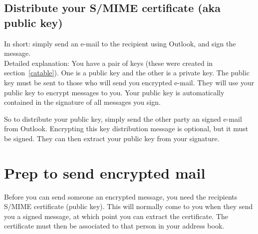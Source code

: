 \documentclass[pdftex,12pt,titlepage=false]{scrartcl}
\begin{document}

\subsection{Distribute your S/MIME certificate (aka public key)}\label{distribution}
In short: simply send an e-mail to the recipient using Outlook, and sign the message.\\

Detailed explanation: You have a pair of keys (these were created in
section~\ref{catable}).  One is a public key and the other is a
private key.  The public key must be sent to those who will send you
encrypted e-mail.  They will use your public key to encrypt messages
to you.  Your public key is automatically contained in the signature
of all messages you sign.

So to distribute your public key, simply send the other party an
signed e-mail from Outlook.  Encrypting this key distribution message
is optional, but it must be signed.  They can then extract your public
key from your signature.

\section{Prep to send encrypted mail%
}
Before you can send someone an encrypted message, you need the
recipients S/MIME certificate (public key).  This will normally come
to you when they send you a signed message, at which point you can
extract the certificate.  The certificate must then be associated to
that person in your address book.
\end{document}
